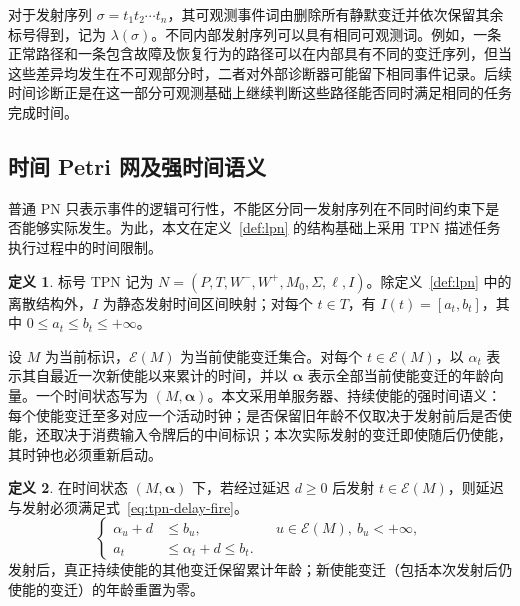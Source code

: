 \documentclass[master,fontset=ubuntu]{shnuthesis}
\theoremstyle{definition}
\newtheorem{thesisdefinition}{定义}
\begin{document}
对于发射序列 \(\sigma=t_1t_2\cdots t_n\)，其可观测事件词由删除所有静默变迁并依次保留其余标号得到，记为 \(\lambda(\sigma)\)。不同内部发射序列可以具有相同可观测词。例如，一条正常路径和一条包含故障及恢复行为的路径可以在内部具有不同的变迁序列，但当这些差异均发生在不可观部分时，二者对外部诊断器可能留下相同事件记录。后续时间诊断正是在这一部分可观测基础上继续判断这些路径能否同时满足相同的任务完成时间。

\subsection{时间 Petri 网及强时间语义}

普通 PN 只表示事件的逻辑可行性，不能区分同一发射序列在不同时间约束下是否能够实际发生。为此，本文在定义~\ref{def:lpn} 的结构基础上采用 TPN 描述任务执行过程中的时间限制\cite{Berthomieu1991,Basile2017}。

\begin{thesisdefinition}
\label{def:tpn}
标号 TPN 记为 \(N=(P,T,W^-,W^+,M_0,\Sigma,\ell,I)\)。除定义~\ref{def:lpn} 中的离散结构外，\(I\) 为静态发射时间区间映射；对每个 \(t\in T\)，有 \(I(t)=[a_t,b_t]\)，其中 \(0\leq a_t\leq b_t\leq+\infty\)。
\end{thesisdefinition}

设 \(M\) 为当前标识，\(\mathcal E(M)\) 为当前使能变迁集合。对每个 \(t\in\mathcal E(M)\)，以 \(\alpha_t\) 表示其自最近一次新使能以来累计的时间，并以 \(\boldsymbol{\alpha}\) 表示全部当前使能变迁的年龄向量。一个时间状态写为 $(M,\boldsymbol{\alpha})$。本文采用单服务器、持续使能的强时间语义：每个使能变迁至多对应一个活动时钟；是否保留旧年龄不仅取决于发射前后是否使能，还取决于消费输入令牌后的中间标识；本次实际发射的变迁即使随后仍使能，其时钟也必须重新启动。

\begin{thesisdefinition}
\label{def:strong-time}
在时间状态 \((M,\boldsymbol{\alpha})\) 下，若经过延迟 \(d\geq0\) 后发射 \(t\in\mathcal E(M)\)，则延迟与发射必须满足式~\eqref{eq:tpn-delay-fire}。
\begin{equation}
\left\{
\begin{aligned}
\alpha_u+d &\leq b_u,
&&u\in\mathcal E(M),\ b_u<+\infty,\\
a_t &\leq \alpha_t+d\leq b_t.
\end{aligned}
\right.
\label{eq:tpn-delay-fire}
\end{equation}
发射后，真正持续使能的其他变迁保留累计年龄；新使能变迁（包括本次发射后仍使能的变迁）的年龄重置为零。
\end{thesisdefinition}
\end{document}
